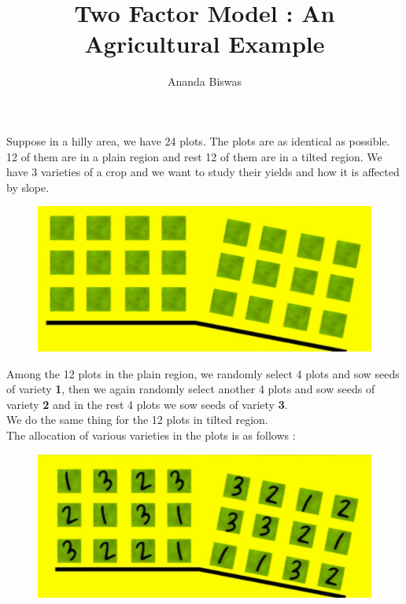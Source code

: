 \documentclass[11pt, a4paper]{article}\usepackage[]{graphicx}\usepackage[dvipsnames]{xcolor}
\title{Two Factor Model : An Agricultural Example}
\author{Ananda Biswas}
\date{}
\begin{document}
\maketitle

Suppose in a hilly area, we have 24 plots. The plots are as identical as possible. 12 of them are in a plain region and rest 12 of them are in a tilted region. We have 3 varieties of a crop and we want to study their yields and how it is affected by slope. \\

\begin{figure}[h]
  \centering
  \includegraphics[scale = 0.5]{plots}
\end{figure}


Among the 12 plots in the plain region, we randomly select 4 plots and sow seeds of variety \textbf{1}, then we again randomly select another 4 plots and sow seeds of variety \textbf{2} and in the rest 4 plots we sow seeds of variety \textbf{3}. \\

We do the same thing for the 12 plots in tilted region. \\

The allocation of various varieties in the plots is as follows : \\

\begin{figure}[h]
  \centering
  \includegraphics[scale = 0.5]{allocation}
\end{figure}
\end{document}
